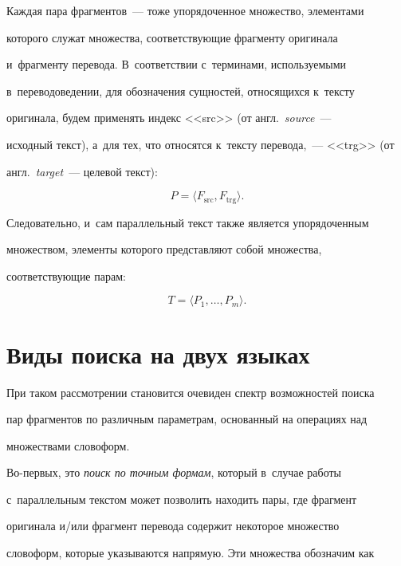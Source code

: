 Каждая пара фрагментов~--- тоже упорядоченное множество, элементами 


которого служат множества, соответствующие фрагменту оригинала 


и~фрагменту перевода. В~соответствии с~терминами, ис\-поль\-зу\-емы\-ми 


в~переводоведении, для обозначения сущностей, относящихся к~текс\-ту 


оригинала, будем применять индекс <<src>> (от англ.\ \textit{source}~--- 


исходный текст), а~для тех, что относятся к~текс\-ту перевода,~--- <<trg>> (от 


англ.\ \textit{target}~--- целевой текст):


$$


     P = \langle F_{\mathrm{src}}, F_{\mathrm{trg}}\rangle.


     $$


Следовательно, и~сам параллельный текст также является упорядоченным 


множеством, элементы которого представляют собой множества, 


соответствующие парам:


$$


     T = \langle P_1, \ldots , P_m\rangle.


     $$





\section{Виды поиска на двух языках}





При таком рассмотрении становится очевиден спектр возможностей поиска 


пар фрагментов по различным параметрам, основанный на операциях над 


множествами словоформ.





Во-первых, это \textit{поиск по точным формам}, который в~случае работы 


с~параллельным текстом может позволить находить пары, где фрагмент 


оригинала и\!/\!или фрагмент перевода содержит некоторое множество 


словоформ, которые указываются напрямую. Эти множества обозначим как 


